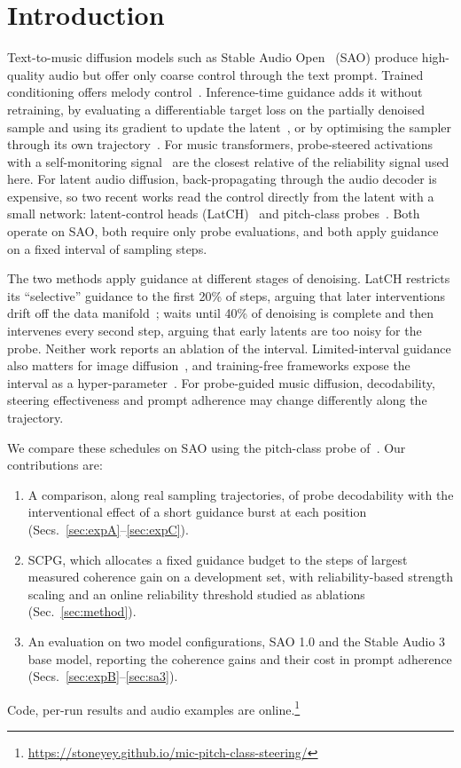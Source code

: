 \documentclass{article}
\begin{document}
\section{Introduction}
\label{sec:intro}
Text-to-music diffusion models such as Stable Audio Open~\cite{evans2024stableaudioopen} (SAO) produce high-quality audio but offer only coarse control through the text prompt. Trained conditioning offers melody control~\cite{wu2024musiccontrolnet,copet2023musicgen}. Inference-time guidance adds it without retraining, by evaluating a differentiable target loss on the partially denoised sample and using its gradient to update the latent~\cite{dhariwal2021diffusion,bansal2023universal,yu2023freedom,ye2024tfg,levy2023controllable}, or by optimising the sampler through its own trajectory~\cite{novack2024ditto}. For music transformers, probe-steered activations with a self-monitoring signal~\cite{koo2024smitin} are the closest relative of the reliability signal used here. For latent audio diffusion, back-propagating through the audio decoder is expensive, so two recent works read the control directly from the latent with a small network: latent-control heads (LatCH)~\cite{novack2026latch} and pitch-class probes~\cite{ye2026pitchclass}. Both operate on SAO, both require only probe evaluations, and both apply guidance on a fixed interval of sampling steps.

The two methods apply guidance at different stages of denoising. LatCH restricts its ``selective'' guidance to the first 20\% of steps, arguing that later interventions drift off the data manifold~\cite{novack2026latch}; \cite{ye2026pitchclass} waits until 40\% of denoising is complete and then intervenes every second step, arguing that early latents are too noisy for the probe. Neither work reports an ablation of the interval. Limited-interval guidance also matters for image diffusion~\cite{kynkaanniemi2024interval}, and training-free frameworks expose the interval as a hyper-parameter~\cite{ye2024tfg}. For probe-guided music diffusion, decodability, steering effectiveness and prompt adherence may change differently along the trajectory.

We compare these schedules on SAO using the pitch-class probe of~\cite{ye2026pitchclass}. Our contributions are:
\begin{enumerate}\setlength\itemsep{0pt}
\item A comparison, along real sampling trajectories, of probe decodability with the interventional effect of a short guidance burst at each position (Secs.~\ref{sec:expA}--\ref{sec:expC}).
\item SCPG, which allocates a fixed guidance budget to the steps of largest measured coherence gain on a development set, with reliability-based strength scaling and an online reliability threshold studied as ablations (Sec.~\ref{sec:method}).
\item An evaluation on two model configurations, SAO 1.0 and the Stable Audio 3 base model, reporting the coherence gains and their cost in prompt adherence (Secs.~\ref{sec:expB}--\ref{sec:sa3}).
\end{enumerate}
Code, per-run results and audio examples are online.\footnote{\url{https://stoneyey.github.io/mic-pitch-class-steering/}}
\end{document}
